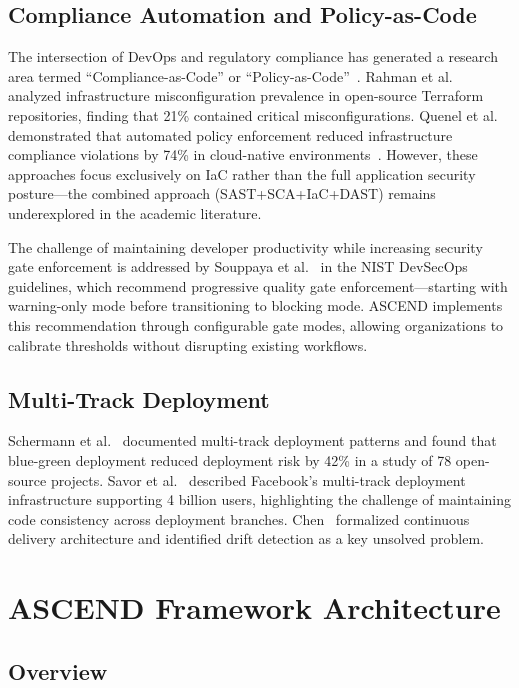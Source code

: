 \documentclass[journal]{IEEEtran}
\begin{document}
\subsection{Compliance Automation and Policy-as-Code}

The intersection of DevOps and regulatory compliance has generated a research area termed ``Compliance-as-Code'' or ``Policy-as-Code''~\cite{nist2023}. Rahman et al.~\cite{checkov2024} analyzed infrastructure misconfiguration prevalence in open-source Terraform repositories, finding that 21\% contained critical misconfigurations. Quenel et al. demonstrated that automated policy enforcement reduced infrastructure compliance violations by 74\% in cloud-native environments~\cite{cis2024}. However, these approaches focus exclusively on IaC rather than the full application security posture---the combined approach (SAST+SCA+IaC+DAST) remains underexplored in the academic literature.

The challenge of maintaining developer productivity while increasing security gate enforcement is addressed by Souppaya et al.~\cite{nist2023} in the NIST DevSecOps guidelines, which recommend progressive quality gate enforcement---starting with warning-only mode before transitioning to blocking mode. ASCEND implements this recommendation through configurable gate modes, allowing organizations to calibrate thresholds without disrupting existing workflows.

\subsection{Multi-Track Deployment}

Schermann et al.~\cite{schermann2018} documented multi-track deployment patterns and found that blue-green deployment reduced deployment risk by 42\% in a study of 78 open-source projects. Savor et al.~\cite{savor2016} described Facebook's multi-track deployment infrastructure supporting 4 billion users, highlighting the challenge of maintaining code consistency across deployment branches. Chen~\cite{chen2015} formalized continuous delivery architecture and identified drift detection as a key unsolved problem.

\section{ASCEND Framework Architecture}
\label{sec:architecture}

\subsection{Overview}
\end{document}
